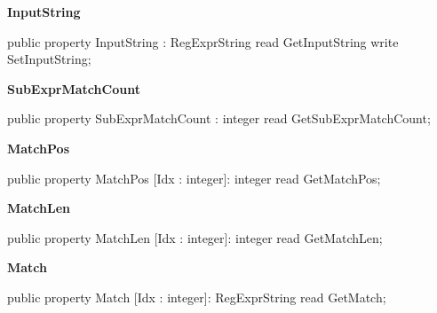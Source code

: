 \documentclass{report}
\newif\ifpdf
\begin{document}
\begin{list}{}
\begin{flushleft}
\ifpdf
\end{flushleft}
\fi


\par  \label{RegExpr.TRegExpr-InputString}
\item[\textbf{InputString}\hfill]
\ifpdf
\begin{flushleft}
\fi
\begin{ttfamily}
public property InputString : RegExprString read GetInputString write SetInputString;\end{ttfamily}

\ifpdf
\end{flushleft}
\fi


\par  \label{RegExpr.TRegExpr-SubExprMatchCount}
\item[\textbf{SubExprMatchCount}\hfill]
\ifpdf
\begin{flushleft}
\fi
\begin{ttfamily}
public property SubExprMatchCount : integer read GetSubExprMatchCount;\end{ttfamily}

\ifpdf
\end{flushleft}
\fi


\par  \label{RegExpr.TRegExpr-MatchPos}
\item[\textbf{MatchPos}\hfill]
\ifpdf
\begin{flushleft}
\fi
\begin{ttfamily}
public property MatchPos [Idx : integer]: integer read GetMatchPos;\end{ttfamily}

\ifpdf
\end{flushleft}
\fi


\par  \label{RegExpr.TRegExpr-MatchLen}
\item[\textbf{MatchLen}\hfill]
\ifpdf
\begin{flushleft}
\fi
\begin{ttfamily}
public property MatchLen [Idx : integer]: integer read GetMatchLen;\end{ttfamily}

\ifpdf
\end{flushleft}
\fi


\par  \label{RegExpr.TRegExpr-Match}
\item[\textbf{Match}\hfill]
\ifpdf
\begin{flushleft}
\fi
\begin{ttfamily}
public property Match [Idx : integer]: RegExprString read GetMatch;\end{ttfamily}


\end{flushleft}
\end{list}
\end{document}

